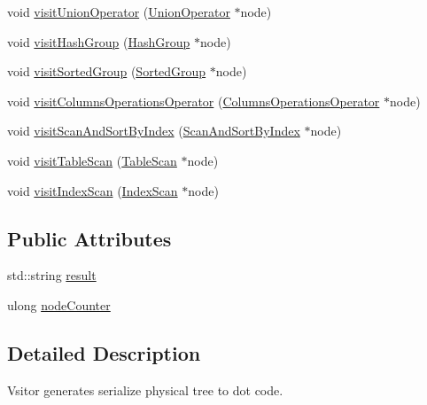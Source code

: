 \begin{DoxyCompactItemize}
\item 
void \hyperlink{classrafe_1_1_physical_operator_drawing_visitor_a9d9921709b02d719159ea0990f041ddd}{visit\+Union\+Operator} (\hyperlink{classrafe_1_1_union_operator}{Union\+Operator} $\ast$node)
\item 
void \hyperlink{classrafe_1_1_physical_operator_drawing_visitor_a81ede5f72bee22e9885236c8056a4556}{visit\+Hash\+Group} (\hyperlink{classrafe_1_1_hash_group}{Hash\+Group} $\ast$node)
\item 
void \hyperlink{classrafe_1_1_physical_operator_drawing_visitor_a5df8d5fca216ef12f6d9b836a310797f}{visit\+Sorted\+Group} (\hyperlink{classrafe_1_1_sorted_group}{Sorted\+Group} $\ast$node)
\item 
void \hyperlink{classrafe_1_1_physical_operator_drawing_visitor_a9c12b247be5746314eb74747bc5d50af}{visit\+Columns\+Operations\+Operator} (\hyperlink{classrafe_1_1_columns_operations_operator}{Columns\+Operations\+Operator} $\ast$node)
\item 
void \hyperlink{classrafe_1_1_physical_operator_drawing_visitor_abd677a519edaf4df41a7a32c7e0fd0cf}{visit\+Scan\+And\+Sort\+By\+Index} (\hyperlink{classrafe_1_1_scan_and_sort_by_index}{Scan\+And\+Sort\+By\+Index} $\ast$node)
\item 
void \hyperlink{classrafe_1_1_physical_operator_drawing_visitor_a0c61159c63401e8a96645a277459650e}{visit\+Table\+Scan} (\hyperlink{classrafe_1_1_table_scan}{Table\+Scan} $\ast$node)
\item 
void \hyperlink{classrafe_1_1_physical_operator_drawing_visitor_a6a74e5a271b3ab7ed954a2821f7dbcc9}{visit\+Index\+Scan} (\hyperlink{classrafe_1_1_index_scan}{Index\+Scan} $\ast$node)
\end{DoxyCompactItemize}
\subsection*{Public Attributes}
\begin{DoxyCompactItemize}
\item 
std\+::string \hyperlink{classrafe_1_1_physical_operator_drawing_visitor_a1e0b2d80743e6a11b4a75af0f68157d8}{result}
\item 
ulong \hyperlink{classrafe_1_1_physical_operator_drawing_visitor_a657ec262f628b93a56bb9ed016d02568}{node\+Counter}
\end{DoxyCompactItemize}


\subsection{Detailed Description}
Vsitor generates serialize physical tree to dot code. 

